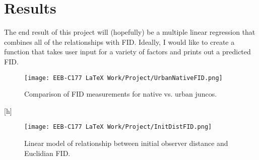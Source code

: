 \documentclass{article}
\begin{document}









\section{Results}
\hspace{1cm}The end result of this project will (hopefully) be a multiple linear regression that combines all of the relationships with FID. Ideally, I would like to create a function that takes user input for a variety of factors and prints out a predicted FID.

\newpage



\newpage

\begin{figure}
\caption{Comparison of FID measurements for native vs. urban juncos.}
\texttt{[image: EEB-C177 LaTeX Work/Project/UrbanNativeFID.png]}
\label{fid:UrbanNative}
\end{figure}[h]

\begin{figure}[h]
\caption{Linear model of relationship between initial observer distance and Euclidian FID.}
\texttt{[image: EEB-C177 LaTeX Work/Project/InitDistFID.png]}
\label{fig:InitDist}
\end{figure}

\newpage


\end{document}
